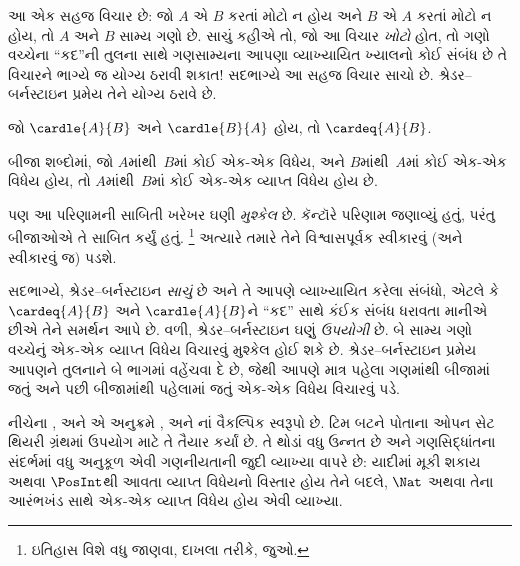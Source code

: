 \begin{explain}
આ એક સહજ વિચાર છે: જો $A$ એ $B$ કરતાં મોટો ન હોય અને $B$ એ
$A$ કરતાં મોટો ન હોય, તો $A$ અને $B$ સામ્ય ગણો છે. સાચું કહીએ તો,
જો આ વિચાર \emph{ખોટો} હોત, તો ગણો વચ્ચેના “કદ”ની તુલના સાથે
ગણસામ્યના આપણા વ્યાખ્યાયિત ખ્યાલનો કોઈ સંબંધ છે તે વિચારને ભાગ્યે જ
યોગ્ય ઠરાવી શકાત!{} સદભાગ્યે આ સહજ વિચાર સાચો છે. શ્રેડર--બર્નસ્ટાઇન
પ્રમેય તેને યોગ્ય ઠરાવે છે.
\end{explain}

\begin{thm}[શ્રેડર--બર્નસ્ટાઇન]
	જો $\cardle{A}{B}$ અને $\cardle{B}{A}$ હોય,
	તો $\cardeq{A}{B}$.
\end{thm}

\begin{explain}
બીજા શબ્દોમાં, જો $A$માંથી~$B$માં કોઈ એક-એક વિધેય, અને
$B$માંથી~$A$માં કોઈ એક-એક વિધેય હોય, તો $A$માંથી~$B$માં
કોઈ એક-એક વ્યાપ્ત વિધેય હોય છે.

પણ આ પરિણામની સાબિતી ખરેખર ઘણી \emph{મુશ્કેલ} છે. કૅન્ટૉરે
પરિણામ જણાવ્યું હતું, પરંતુ બીજાઓએ તે સાબિત કર્યું હતું.
\footnote{ઇતિહાસ વિશે વધુ જાણવા, દાખલા તરીકે,
\citet[pp.~165--6]{Potter2004} જુઓ.}
%
અત્યારે તમારે તેને વિશ્વાસપૂર્વક સ્વીકારવું (અને સ્વીકારવું જ) પડશે.

સદભાગ્યે, શ્રેડર--બર્નસ્ટાઇન \emph{સાચું} છે અને તે આપણે વ્યાખ્યાયિત
કરેલા સંબંધો, એટલે કે $\cardeq{A}{B}$ અને $\cardle{A}{B}$ને “કદ”
સાથે કંઈક સંબંધ ધરાવતા માનીએ છીએ તેને સમર્થન આપે છે. વળી,
શ્રેડર--બર્નસ્ટાઇન ઘણું \emph{ઉપયોગી} છે. બે સામ્ય ગણો વચ્ચેનું
એક-એક વ્યાપ્ત વિધેય વિચારવું મુશ્કેલ હોઈ શકે છે. શ્રેડર--બર્નસ્ટાઇન પ્રમેય
આપણને તુલનાને બે ભાગમાં વહેંચવા દે છે, જેથી આપણે માત્ર પહેલા ગણમાંથી
બીજામાં જતું અને પછી બીજામાંથી પહેલામાં જતું એક-એક વિધેય વિચારવું પડે.
\end{explain}
\endgroup


\begin{editorial}
નીચેના ,
 અને 
એ અનુક્રમે ,
 અને નાં
વૈકલ્પિક સ્વરૂપો છે. ટિમ બટને પોતાના ઓપન સેટ થિયરી
ગ્રંથમાં ઉપયોગ માટે તે તૈયાર કર્યાં છે. તે થોડાં વધુ
ઉન્નત છે અને ગણસિદ્ધાંતના સંદર્ભમાં વધુ અનુકૂળ એવી
ગણનીયતાની જુદી વ્યાખ્યા વાપરે છે: યાદીમાં મૂકી શકાય
અથવા $\PosInt$થી આવતા વ્યાપ્ત વિધેયનો વિસ્તાર હોય
તેને બદલે, $\Nat$ અથવા તેના આરંભખંડ સાથે એક-એક
વ્યાપ્ત વિધેય હોય એવી વ્યાખ્યા.
\end{editorial}

